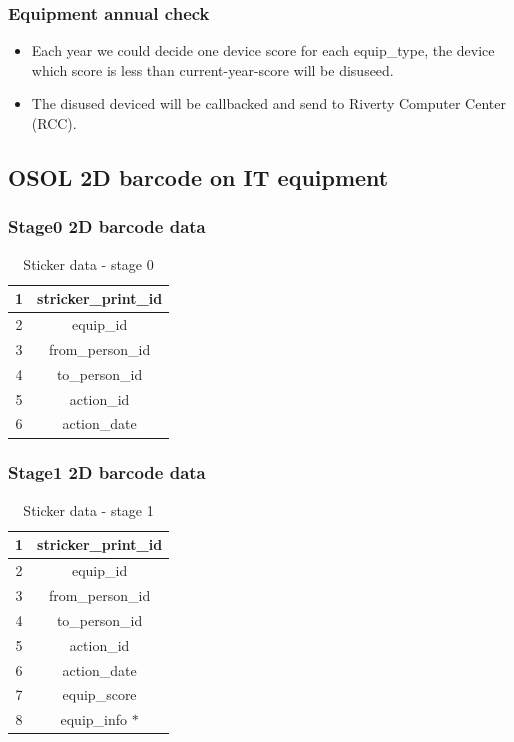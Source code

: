\documentclass[a4paper,11pt]{article}
\begin{document}
\subsubsection{Equipment annual check}
	\begin{itemize}
		\item Each year we could decide one device score for each equip\_type, the device which score is less than current-year-score will be disuseed.
		\item The disused deviced will be callbacked and send to Riverty Computer Center (RCC).
	\end{itemize}
\subsection{OSOL 2D barcode on IT equipment}

\subsubsection {Stage0 2D barcode data}
\begin{table}[h!]
\begin{center}
	\begin{tabular}{ | c | c | }
		\hline
		1 & stricker\_print\_id \\ 
		\hline
		2 & equip\_id  \\  
		\hline
		3 & from\_person\_id \\
		\hline
		4 & to\_person\_id \\ 
		\hline
		5 &  action\_id \\  
		\hline
		6 & action\_date \\
		\hline
	\end{tabular}
	\caption{Sticker data \-- stage 0}
	\label{table:sticker_data_stage_0}
\end{center}
\end{table}

\subsubsection {Stage1 2D barcode data}
\begin{table}[h!]
	\begin{center}
		\begin{tabular}{ | c | c | }
			\hline
			1 & stricker\_print\_id \\ 
			\hline
			2 & equip\_id  \\  
			\hline
			3 & from\_person\_id \\
			\hline
			4 & to\_person\_id \\ 
			\hline
			5 &  action\_id \\  
			\hline
			6 & action\_date \\
			\hline
			7 &  equip\_score \\  
			\hline
			8 & equip\_info $*$ \\
			\hline
		\end{tabular}
		\caption{Sticker data \-- stage 1}
		\label{table:sticker_data_stage_1}
	\end{center}
\end{table}
\end{document}
